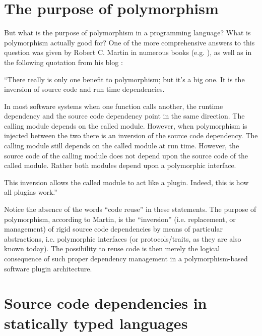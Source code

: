 \documentclass[11pt,oneside]{report}
\begin{document}
\section{The purpose of polymorphism}

But what is the purpose of polymorphism in a programming language?
What is polymorphism actually good for? One of the more comprehensive
answers to this question was given by Robert C. Martin in numerous
books (e.g. \cite{Martin_17}), as well as in the following quotation
from his blog \cite{Martin_14}:

\begin{displayquote}
``There really is only one benefit to polymorphism; but it's a big
  one. It is the inversion of source code and run time dependencies.

  In most software systems when one function calls another, the
  runtime dependency and the source code dependency point in the same
  direction. The calling module depends on the called module. However,
  when polymorphism is injected between the two there is an inversion
  of the source code dependency. The calling module still depends on
  the called module at run time. However, the source code of the
  calling module does not depend upon the source code of the called
  module. Rather both modules depend upon a polymorphic
  interface.

  This inversion allows the called module to act like a
  plugin. Indeed, this is how all plugins work.''
\end{displayquote}

Notice the absence of the words ``code reuse'' in these statements.
The purpose of polymorphism, according to Martin, is the ``inversion''
(i.e. replacement, or management) of rigid source code dependencies by
means of particular abstractions, i.e. polymorphic interfaces (or
protocols/traits, as they are also known today). The possibility to
reuse code is then merely the logical consequence of such proper
dependency management in a polymorphism-based software plugin
architecture.

\section{Source code dependencies in statically typed languages}
\end{document}
